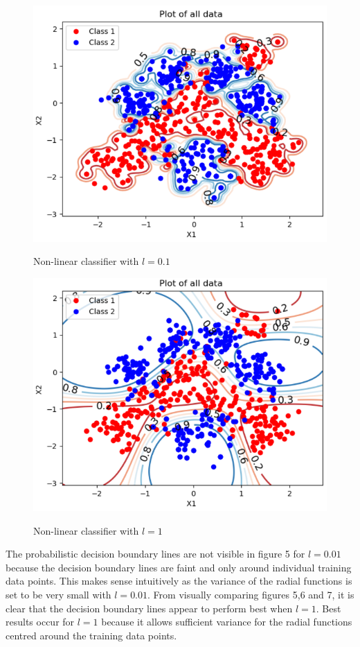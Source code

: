 \documentclass[twocolumn]{article}
\begin{document}
\begin{figure}[!htb]
	\centering\includegraphics[width=\columnwidth]{3}\\
	\caption{Non-linear classifier with $l=0.1$}\label{tria}
\end{figure}

\begin{figure}[!htb]
	\centering\includegraphics[width=\columnwidth]{4}\\
	\caption{Non-linear classifier with $l=1$}\label{tri}
\end{figure}

The probabilistic decision boundary lines are not visible in figure 5 for $l=0.01$ because the decision boundary lines are faint and only around individual training data points. This makes sense intuitively as the variance of the radial functions is set to be very small with $l=0.01$. From visually comparing figures 5,6 and 7, it is clear that the decision boundary lines appear to perform best when $l=1$. Best results occur for $l=1$ because it allows sufficient variance for the radial functions centred around the training data points.
\end{document}
